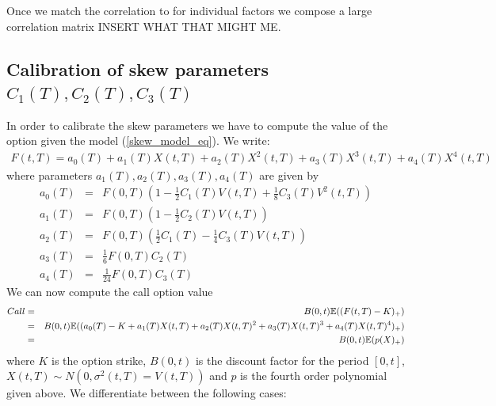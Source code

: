 \documentclass[12pt]{article}
\begin{document}
Once we match the correlation to for individual factors we compose a large correlation matrix INSERT WHAT THAT MIGHT ME. 



\subsection {Calibration of skew parameters $C_1(T),C_2(T),C_3(T)$}
\label {skew_calib}

In order to calibrate the skew parameters we have to compute 
the value of the option given the model (\ref{skew_model_eq}). 
We write: 
\begin {eqnarray*}
  F(t,T) = a_0 (T) + a_1 (T) X(t,T) + a_2 (T) X^2 (t,T) + 
  a_3 (T) X^3 (t,T) + a_4 (T) X^4 (t,T) 
\end {eqnarray*}
where parameters $a_1(T), a_2(T), a_3(T), a_4(T)$ are given by 
\begin {eqnarray*}
  a_0 (T) & = & F(0,T) ( 1 - \frac 1 2 C_1 (T) V(t,T)+ \frac 1 8 C_3 (T) V^2 (t,T) )
  \\
  a_1 (T) & = & F(0,T) ( 1 - \frac 1 2 C_2 (T) V(t,T) )
  \\
  a_2 (T) & = & F(0,T) ( \frac 1 2 C_1 (T)- \frac 1 4 C_3 (T) V(t,T) )
  \\
  a_3 (T) & = & \frac 1 6 F(0,T) C_2 (T)
  \\
  a_4 (T) & = & \frac 1 {24} F(0,T) C_3 (T)
\end {eqnarray*}
We can now compute the call option value 
\begin {eqnarray*}
  Call & = & B(0,t) \mathbb {E} ( (F(t,T) - K )_+ )
  \\
  & = & B(0,t) \mathbb {E} ( (a_0(T) - K + a_1 (T) X(t,T) + 
  a_2 (T) X(t,T)^2 + a_3 (T) X(t,T)^3 + a_4 (T) X(t,T)^4  
  )_+ )
  \\
  & = & B(0,t) \mathbb {E} ( p(X)_+ )
\end {eqnarray*}
where $K$ is the option strike, $B(0,t)$ is the discount 
factor for the period $[0,t] $, $X(t,T) \sim N(0, \sigma^2 (t,T) =V(t,T))$ and 
$p$ is the fourth order polynomial given above. 
We differentiate between the following cases: 
\end{document}
